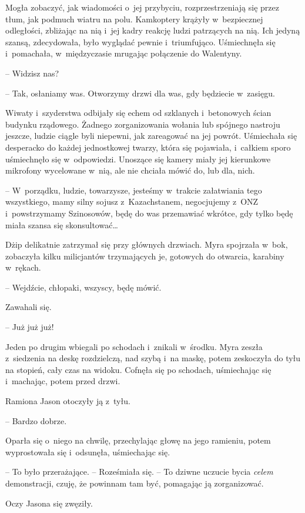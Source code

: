 \documentclass[oneside,polish,11pt,sfheadings]{mwbk}
\begin{document}
Mogła zobaczyć, jak wiadomości o~jej przybyciu, rozprzestrzeniają się
przez tłum, jak podmuch wiatru na polu. Kamkoptery krążyły w~bezpiecznej
odległości, zbliżając na nią i~jej kadry reakcję ludzi patrzących na
nią. Ich jedyną szansą, zdecydowała, było wyglądać pewnie i~triumfująco.
Uśmiechnęła się i~pomachała, w~międzyczasie mrugając połączenie do
Walentyny.

-- Widzisz nas?

-- Tak, osłaniamy was. Otworzymy drzwi dla was, gdy będziecie w~zasięgu.

Wiwaty i~szyderstwa odbijały się echem od szklanych i~betonowych ścian
budynku rządowego. Żadnego zorganizowania wołania lub spójnego nastroju
jeszcze, ludzie ciągle byli niepewni, jak zareagować na jej powrót.
Uśmiechała się desperacko do każdej jednostkowej twarzy, która się
pojawiała, i~całkiem sporo uśmiechnęło się w~odpowiedzi. Unoszące się
kamery miały jej kierunkowe mikrofony wycelowane w~nią, ale nie chciała
mówić do, lub dla, nich.

-- W~porządku, ludzie, towarzysze, jesteśmy w~trakcie załatwiania tego
wszystkiego, mamy silny sojusz z~Kazachstanem, negocjujemy z~ONZ i~powstrzymamy Szinosowów, będę do was przemawiać wkrótce, gdy tylko będę
miała szansa się skonsultować\ldots

Dżip delikatnie zatrzymał się przy głównych drzwiach. Myra spojrzała w~bok, zobaczyła kilku milicjantów trzymających je, gotowych do otwarcia,
karabiny w~rękach.

-- Wejdźcie, chłopaki, wszyscy, będę mówić.

Zawahali się.

-- Już już już!

Jeden po drugim wbiegali po schodach i~znikali w~środku. Myra zeszła z~siedzenia na deskę rozdzielczą, nad szybą i~na maskę, potem zeskoczyła
do tyłu na stopień, cały czas na widoku. Cofnęła się po schodach,
uśmiechając się i~machając, potem przed drzwi.

Ramiona Jason otoczyły ją z~tyłu.

-- Bardzo dobrze.

Oparła się o~niego na chwilę, przechylając głowę na jego ramieniu, potem
wyprostowała się i~odsunęła, uśmiechając się.

-- To było przerażające. -- Roześmiała się. -- To dziwne uczucie bycia
\textit{celem} demonstracji, czuję, że powinnam tam być, pomagając ją
zorganizować.

Oczy Jasona się zwęziły. 
\end{document}

